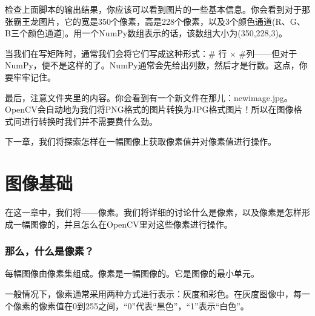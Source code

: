 \documentclass[color=green,mathpazo,titlestyle=hang]{elegantbook}
\begin{document}
检查上面脚本的输出结果，你应该可以看到图片的一些基本信息。你会看到对于那张霸王龙图片，它的宽是350个像素，高是228个像素，以及3个颜色通道(R、G、B三个颜色通道)。用一个NumPy数组表示的话，该数组大小为(350,228,3)。

当我们在写矩阵时，通常我们会将它们写成这种形式：\# 行 $\times$ \#列——但对于NumPy，便不是这样的了。NumPy通常会先给出列数，然后才是行数。这点，你要牢牢记住。

最后，注意文件夹里的内容。你会看到有一个新文件在那儿：newimage.jpg。OpenCV会自动地为我们将PNG格式的图片转换为JPG格式图片！所以在图像格式间进行转换时我们并不需要费什么劲。

下一章，我们将探索怎样在一幅图像上获取像素值并对像素值进行操作。

\chapter{图像基础}

在这一章中，我们将{\color{red}{审查图像的积木}}——像素。我们将详细的讨论什么是像素，以及像素是怎样形成一幅图像的，并且怎么在OpenCV里对这些像素进行操作。

\subsection{那么，什么是像素？}

每幅图像由像素集组成。像素是一幅图像的{\color{red}{原材料，积木}}。它是图像的最小单元。

一般情况下，像素通常采用两种方式进行表示：灰度和彩色。在灰度图像中，每一个像素的像素值在0到255之间，“0”代表“黑色”，“1”表示“白色”。



\end{document}
